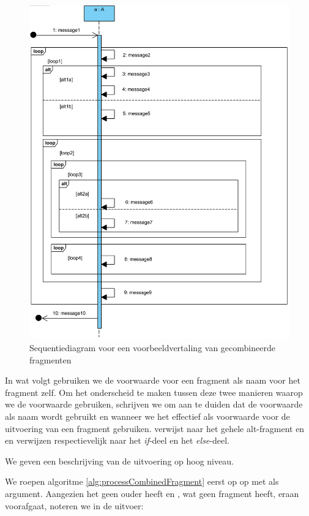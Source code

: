 \begin{figure}
	\includegraphics[width=1\textwidth]{chap-gedrag/seq-diagram-frag-ex.png}
	\caption{Sequentiediagram voor een voorbeeldvertaling van gecombineerde fragmenten}
	\label{fig:seq-diagram-frag-ex}
\end{figure}

In wat volgt gebruiken we de voorwaarde voor een fragment als naam voor het fragment zelf. Om het onderscheid te maken tussen deze twee manieren waarop we de voorwaarde gebruiken, schrijven we  om aan te duiden dat de voorwaarde als naam wordt gebruikt en  wanneer we het effectief als voorwaarde voor de uitvoering van een fragment gebruiken.  verwijst naar het gehele alt-fragment en  en  verwijzen respectievelijk naar het \textit{if}-deel en het \textit{else}-deel.

We geven een beschrijving van de uitvoering op hoog niveau.

We roepen algoritme \ref{alg:processCombinedFragment} eerst op op met  als argument. Aangezien het geen ouder heeft en , wat geen fragment heeft, eraan voorafgaat, noteren we in de uitvoer:

